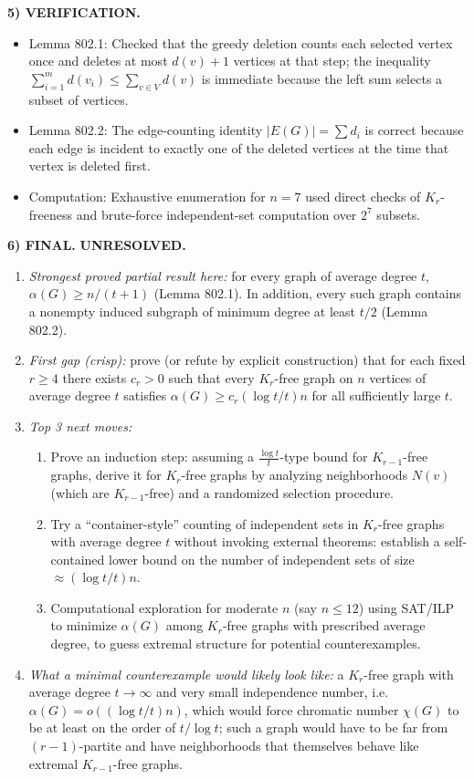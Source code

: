 \medskip
\noindent\textbf{5) VERIFICATION.}

\begin{itemize}
\item Lemma 802.1: Checked that the greedy deletion counts each selected vertex once and deletes at most $d(v)+1$ vertices at that step; the inequality $\sum_{i=1}^m d(v_i)\le \sum_{v\in V} d(v)$ is immediate because the left sum selects a subset of vertices.
\item Lemma 802.2: The edge-counting identity $|E(G)|=\sum d_i$ is correct because each edge is incident to exactly one of the deleted vertices at the time that vertex is deleted first.
\item Computation: Exhaustive enumeration for $n=7$ used direct checks of $K_r$-freeness and brute-force independent-set computation over $2^7$ subsets.
\end{itemize}

\medskip
\noindent\textbf{6) FINAL.} \textbf{UNRESOLVED.}

\begin{enumerate}
\item[(i)] \emph{Strongest proved partial result here:} for every graph of average degree $t$, $\alpha(G)\ge n/(t+1)$ (Lemma 802.1). In addition, every such graph contains a nonempty induced subgraph of minimum degree at least $t/2$ (Lemma 802.2).
\item[(ii)] \emph{First gap (crisp):} prove (or refute by explicit construction) that for each fixed $r\ge 4$ there exists $c_r>0$ such that every $K_r$-free graph on $n$ vertices of average degree $t$ satisfies $\alpha(G)\ge c_r (\log t/t)n$ for all sufficiently large $t$.
\item[(iii)] \emph{Top 3 next moves:}
  \begin{enumerate}
  \item Prove an induction step: assuming a $\frac{\log t}{t}$-type bound for $K_{r-1}$-free graphs, derive it for $K_r$-free graphs by analyzing neighborhoods $N(v)$ (which are $K_{r-1}$-free) and a randomized selection procedure.
  \item Try a ``container-style'' counting of independent sets in $K_r$-free graphs with average degree $t$ without invoking external theorems: establish a self-contained lower bound on the number of independent sets of size $\approx (\log t/t)n$.
  \item Computational exploration for moderate $n$ (say $n\le 12$) using SAT/ILP to minimize $\alpha(G)$ among $K_r$-free graphs with prescribed average degree, to guess extremal structure for potential counterexamples.
  \end{enumerate}
\item[(iv)] \emph{What a minimal counterexample would likely look like:} a $K_r$-free graph with average degree $t\to\infty$ and very small independence number, i.e. $\alpha(G)=o((\log t/t)n)$, which would force chromatic number $\chi(G)$ to be at least on the order of $t/\log t$; such a graph would have to be far from $(r-1)$-partite and have neighborhoods that themselves behave like extremal $K_{r-1}$-free graphs.
\end{enumerate}




